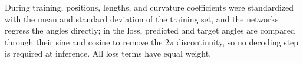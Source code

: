 During training, positions, lengths, and curvature coefficients were standardized with the mean and standard deviation of the training set, and the networks regress the angles directly; in the loss, predicted and target angles are compared through their sine and cosine to remove the $2\pi$ discontinuity, so no decoding step is required at inference. All loss terms have equal weight.
